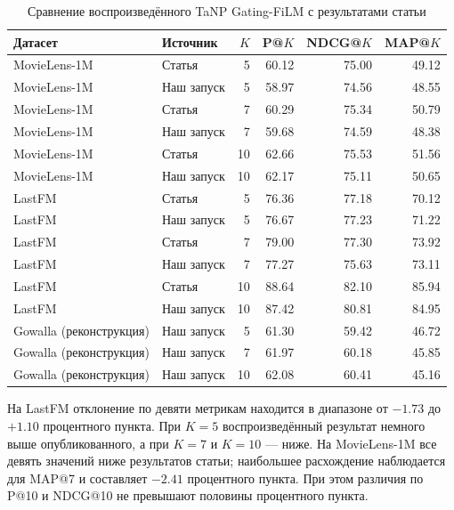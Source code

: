 \documentclass[12pt,a4paper]{article}
\begin{document}
\begin{table}[H]
    \centering
    \caption{Сравнение воспроизведённого TaNP Gating-FiLM с результатами статьи}
    \label{tab:baseline-reproduction}
    \begin{tabular}{llrrrr}
        \toprule
        Датасет & Источник & $K$ & P@$K$ & NDCG@$K$ & MAP@$K$ \\
        \midrule
        MovieLens-1M & Статья & 5 & 60.12 & 75.00 & 49.12 \\
        MovieLens-1M & Наш запуск & 5 & 58.97 & 74.56 & 48.55 \\
        MovieLens-1M & Статья & 7 & 60.29 & 75.34 & 50.79 \\
        MovieLens-1M & Наш запуск & 7 & 59.68 & 74.59 & 48.38 \\
        MovieLens-1M & Статья & 10 & 62.66 & 75.53 & 51.56 \\
        MovieLens-1M & Наш запуск & 10 & 62.17 & 75.11 & 50.65 \\
        \midrule
        LastFM & Статья & 5 & 76.36 & 77.18 & 70.12 \\
        LastFM & Наш запуск & 5 & 76.67 & 77.23 & 71.22 \\
        LastFM & Статья & 7 & 79.00 & 77.30 & 73.92 \\
        LastFM & Наш запуск & 7 & 77.27 & 75.63 & 73.11 \\
        LastFM & Статья & 10 & 88.64 & 82.10 & 85.94 \\
        LastFM & Наш запуск & 10 & 87.42 & 80.81 & 84.95 \\
        \midrule
        Gowalla (реконструкция) & Наш запуск & 5 & 61.30 & 59.42 & 46.72 \\
        Gowalla (реконструкция) & Наш запуск & 7 & 61.97 & 60.18 & 45.85 \\
        Gowalla (реконструкция) & Наш запуск & 10 & 62.08 & 60.41 & 45.16 \\
        \bottomrule
    \end{tabular}
\end{table}

На LastFM отклонение по девяти метрикам находится в диапазоне от $-1.73$ до
$+1.10$ процентного пункта. При $K=5$ воспроизведённый результат немного выше
опубликованного, а при $K=7$ и $K=10$ --- ниже. На MovieLens-1M все девять
значений ниже результатов статьи; наибольшее расхождение наблюдается для
MAP@7 и составляет $-2.41$ процентного пункта. При этом различия по P@10 и
NDCG@10 не превышают половины процентного пункта.
\end{document}
